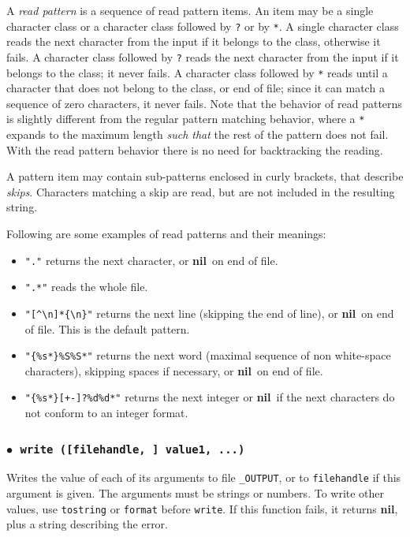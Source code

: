 \documentclass[11pt]{article}
\newcommand{\T}[1]{{\tt #1}}
\newcommand{\nil}{{\bf nil}}
\newcommand{\Def}[1]{\emph{#1}\index{#1}}
\newcommand{\Deffunc}[1]{\index{#1}}
\newcommand{\ff}{$\bullet$\ }
\begin{document}
A \Def{read pattern} is a sequence of read pattern items.
An item may be a single character class
or a character class followed by \verb|?| or by \verb|*|.
A single character class reads the next character from the input
if it belongs to the class, otherwise it fails.
A character class followed by \verb|?| reads the next character
from the input if it belongs to the class;
it never fails.
A character class followed by \verb|*| reads until a character that
does not belong to the class, or end of file;
since it can match a sequence of zero characters, it never fails.
Note that the behavior of read patterns is slightly different from
the regular pattern matching behavior,
where a \verb|*| expands to the maximum length \emph{such that}
the rest of the pattern does not fail.
With the read pattern behavior
there is no need for backtracking the reading.

A pattern item may contain sub-patterns enclosed in curly brackets,
that describe \Def{skips}.
Characters matching a skip are read,
but are not included in the resulting string.

Following are some examples of read patterns and their meanings:
\begin{itemize}
\item \verb|"."| returns the next character, or \nil\ on end of file.
\item \verb|".*"| reads the whole file.
\item \verb|"[^\n]*{\n}"| returns the next line
(skipping the end of line), or \nil\ on end of file.
This is the default pattern.
\item \verb|"{%s*}%S%S*"| returns the next word
(maximal sequence of non white-space characters),
skipping spaces if necessary,
or \nil\ on end of file.
\item \verb|"{%s*}[+-]?%d%d*"| returns the next integer
or \nil\ if the next characters do not conform to an integer format.
\end{itemize}

\subsubsection*{\ff \T{write ([filehandle, ] value1, ...)}}\Deffunc{write}

Writes the value of each of its arguments to
file \verb|_OUTPUT|,
or to \verb|filehandle| if this argument is given.
The arguments must be strings or numbers.
To write other values,
use \verb|tostring| or \verb|format| before \verb|write|.
If this function fails, it returns \nil,
plus a string describing the error.
\end{document}
